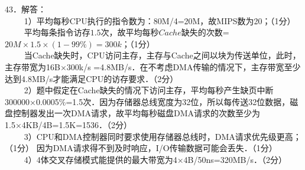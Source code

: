 43．解答：\\
$\qquad$ 1）平均每秒CPU执行的指令数为：80M/4=20M，故MIPS数为20；（1分） \\
$\qquad$ 平均每条指令访存$1.5$次，故平均每秒$Cache$缺失的次数=$20M \times 1.5 \times (1-99\%)=300k$；（1分） \\
$\qquad$ 当Cache缺失时，CPU访问主存，主存与Cache之间以块为传送单位，此时，主存带宽为16B×300k/s =4.8MB/s．在不考虑DMA传输的情况下，主存带宽至少达到4.8MB/s才能满足CPU的访存要求．（2分） \\
$\qquad$ 2）题中假定在Cache缺失的情况下访问主存，平均每秒产生缺页中断300000×0.0005\%=1.5次．因为存储器总线宽度为32位，所以每传送32位数据，磁盘控制器发出一次DMA请求，故平均每秒磁盘DMA请求的次数至少为1.5×4KB/4B=1.5K=1536．（2分） \\
$\qquad$ 3）CPU和DMA控制器同时要求使用存储器总线时，DMA请求优先级更高；（1分） 因为DMA请求得不到及时响应，I/O传输数据可能会丢失．（1分） \\
$\qquad$ 4）4体交叉存储模式能提供的最大带宽为4×4B/50ns=320MB/s．（2分）

